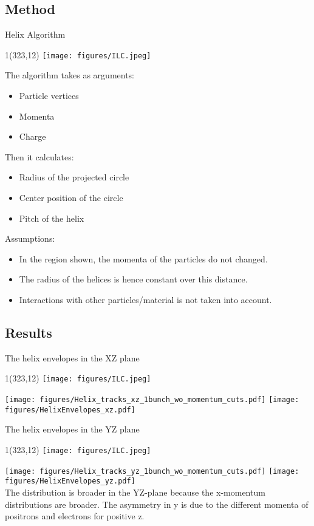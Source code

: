 \documentclass[xcolor={dvipsnames}]{beamer}
\newcommand{\ilclogo}{
  \setlength{\TPHorizModule}{1pt}
  \setlength{\TPVertModule}{1pt}
  \begin{textblock}{1}(323,12)
   \texttt{[image: figures/ILC.jpeg]}
  \end{textblock}
}
\begin{document}
\subsection{Method}
\begin{frame}{Helix Algorithm}
\ilclogo

The algorithm takes as arguments:
\begin{itemize}
 \item Particle vertices
 \item Momenta
 \item Charge
\end{itemize}

Then it calculates:
\begin{itemize}
 \item Radius of the projected circle
 \item Center position of the circle
 \item Pitch of the helix
\end{itemize}

Assumptions:
\begin{itemize}
 \item In the region shown, the momenta of the particles do not changed.
 \item The radius of the helices is hence constant over this distance.
 \item Interactions with other particles/material is not taken into account.
\end{itemize}
\end{frame}

\subsection{Results}
\begin{frame}{The helix envelopes in the XZ plane}
\ilclogo
\texttt{[image: figures/Helix\_tracks\_xz\_1bunch\_wo\_momentum\_cuts.pdf]}
\texttt{[image: figures/HelixEnvelopes\_xz.pdf]}
\end{frame}
\begin{frame}{The helix envelopes in the YZ plane}
\ilclogo
\texttt{[image: figures/Helix\_tracks\_yz\_1bunch\_wo\_momentum\_cuts.pdf]}
\texttt{[image: figures/HelixEnvelopes\_yz.pdf]}\\
The distribution is broader in the YZ-plane because the x-momentum distributions are broader.
The asymmetry in y is due to the different momenta of positrons and electrons for positive z.
\end{frame}
\end{document}
